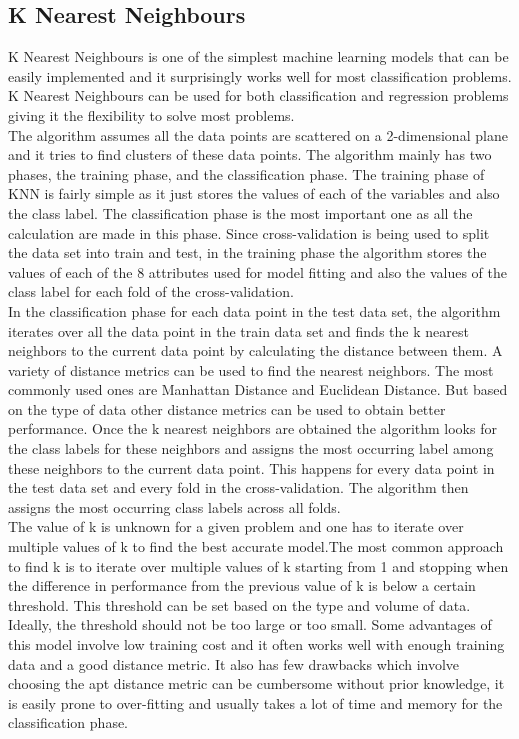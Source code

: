 \documentclass[sigconf]{acmart}
\begin{document}
\subsection{K Nearest Neighbours}
K Nearest Neighbours is one of the simplest machine learning models that can be easily implemented and it surprisingly works well for most classification problems. K Nearest Neighbours can be used for both classification and regression problems giving it the flexibility to solve most problems.\\
The algorithm assumes all the data points are scattered on a 2-dimensional plane and it tries to find clusters of these data points. The algorithm mainly has two phases, the training phase, and the classification phase. The training phase of KNN is fairly simple as it just stores the values of each of the variables and also the class label. The classification phase is the most important one as all the calculation are made in this phase. Since cross-validation is being used to split the data set into train and test, in the training phase the algorithm stores the values of each of the 8 attributes used for model fitting and also the values of the class label for each fold of the cross-validation.\\
In the classification phase for each data point in the test data set, the algorithm iterates over all the data point in the train data set and finds the k nearest neighbors to the current data point by calculating the distance between them. A variety of distance metrics can be used to find the nearest neighbors. The most commonly used ones are Manhattan Distance and Euclidean Distance. But based on the type of data other distance metrics can be used to obtain better performance. Once the k nearest neighbors are obtained the algorithm looks for the class labels for these neighbors and assigns the most occurring label among these neighbors to the current data point. This happens for every data point in the test data set and every fold in the cross-validation. The algorithm then assigns the most occurring class labels across all folds.\\
The value of k is unknown for a given problem and one has to iterate over multiple values of k to find the best accurate model.The most common approach to find k is to iterate over multiple values of k starting from 1 and stopping when the difference in performance from the previous value of k is below a certain threshold. This threshold can be set based on the type and volume of data. Ideally, the threshold should not be too large or too small. Some advantages of this model involve low training cost and it often works well with enough training data and a good distance metric. It also has few drawbacks which involve choosing the apt distance metric can be cumbersome without prior knowledge, it is easily prone to over-fitting and usually takes a lot of time and memory for the classification phase.\\
\end{document}
